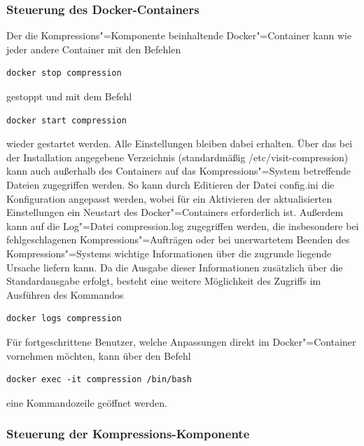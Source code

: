 \subsubsection{Steuerung des Docker-Containers}

Der die Kompressions"=Komponente beinhaltende Docker"=Container kann wie jeder andere Container mit den Befehlen
\begin{lstlisting}[caption={Kommando zum Beenden des Docker-Containers der Kompressions-Komponente},label=schlenke:lst:dockerstop]
docker stop compression
\end{lstlisting}
gestoppt und mit dem Befehl
\begin{lstlisting}[caption={Kommando zum Starten des Docker-Containers der Kompressions-Komponente}]
docker start compression
\end{lstlisting}
wieder gestartet werden. Alle Einstellungen bleiben dabei erhalten. Über das bei der Installation angegebene Verzeichnis (standardmäßig {\ttfamily /etc/visit-compression}) kann auch außerhalb des Containers auf das Kompressions"=System betreffende Dateien zugegriffen werden. So kann durch Editieren der Datei {\ttfamily config.ini} die Konfiguration angepasst werden, wobei für ein Aktivieren der aktualisierten Einstellungen ein Neustart des Docker"=Containers erforderlich ist. Außerdem kann auf die Log"=Datei {compression.log} zugegriffen werden, die insbesondere bei fehlgeschlagenen Kompressions"=Aufträgen oder bei unerwartetem Beenden des Kompressions"=Systems wichtige Informationen über die zugrunde liegende Ursache liefern kann. Da die Ausgabe dieser Informationen zusätzlich über die Standardausgabe erfolgt, besteht eine weitere Möglichkeit des Zugriffs im Ausführen des Kommandos
\begin{lstlisting}[caption={Kommando zum Anzeigen der Ausgaben des Kompressions-Systems}]
docker logs compression
\end{lstlisting}
Für fortgeschrittene Benutzer, welche Anpassungen direkt im Docker"=Container vornehmen möchten, kann über den Befehl
\begin{lstlisting}[caption={Befehl zum Öffnen einer Kommandozeile im Kompressions-Container}]
docker exec -it compression /bin/bash
\end{lstlisting}
eine Kommandozeile geöffnet werden.

\subsubsection{Steuerung der Kompressions-Komponente}

